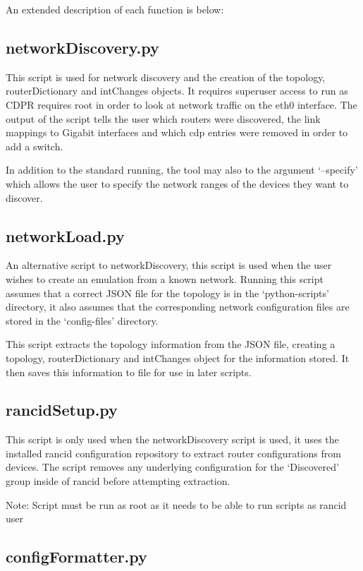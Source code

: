 \documentclass[11pt]{report}
\begin{document}
\begin{appendices}
An extended description of each function is below:

\subsection{networkDiscovery.py}

This script is used for network discovery and the creation of the topology, routerDictionary and intChanges objects. It requires superuser access to run as CDPR requires root in order to look at network traffic on the eth0 interface. The output of the script tells the user which routers were discovered, the link mappings to Gigabit interfaces and which cdp entries were removed in order to add a switch.

In addition to the standard running, the tool may also to the argument `--specify' which allows the user to specify the network ranges of the devices they want to discover.

\subsection{networkLoad.py}

An alternative script to networkDiscovery, this script is used when the user wishes to create an emulation from a known network. Running this script assumes that a correct JSON file for the topology is in the `python-scripts' directory, it also assumes that the corresponding network configuration files are stored in the `config-files' directory.

This script extracts the topology information from the JSON file, creating a topology, routerDictionary and intChanges object for the information stored. It then saves this information to file for use in later scripts.

\subsection{rancidSetup.py}

This script is only used when the networkDiscovery script is used, it uses the installed rancid configuration repository to extract router configurations from devices. The script removes any underlying configuration for the `Discovered' group inside of rancid before attempting extraction.

Note: Script must be run as root as it needs to be able to run scripts as rancid user

\subsection{configFormatter.py}


\end{appendices}
\end{document}
